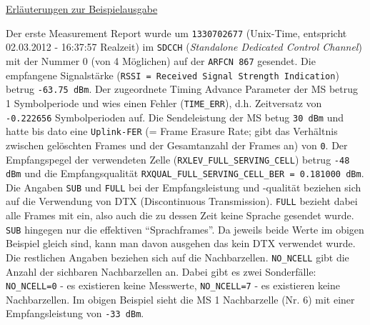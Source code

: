 \underline{Erläuterungen zur Beispielausgabe}

Der erste Measurement Report wurde um \verb|1330702677| (Unix-Time, entspricht 02.03.2012 - 16:37:57 Realzeit) im \verb|SDCCH| (\textit{Standalone Dedicated Control Channel}) mit der Nummer 0 (von 4 Möglichen) auf der \verb|ARFCN 867| gesendet. Die empfangene Signalstärke (\verb|RSSI = Received Signal Strength Indication|) betrug \verb|-63.75 dBm|. Der zugeordnete Timing Advance Parameter der MS betrug 1 Symbolperiode und wies einen Fehler (\verb|TIME_ERR|), d.h. Zeitversatz von \verb|-0.222656| Symbolperioden auf. Die Sendeleistung der MS betug \verb|30 dBm| und hatte bis dato eine \verb|Uplink-FER| (= Frame Erasure Rate; gibt das Verhältnis zwischen gelöschten Frames und der Gesamtanzahl der Frames an) von \verb|0|. Der Empfangspegel der verwendeten Zelle (\verb|RXLEV_FULL_SERVING_CELL|) betrug \verb|-48 dBm| und die Empfangsqualität \verb|RXQUAL_FULL_SERVING_CELL_BER = 0.181000 dBm|. Die Angaben \verb|SUB| und \verb|FULL| bei der Empfangsleistung und -qualität beziehen sich auf die Verwendung von DTX (Discontinuous Transmission). \verb|FULL| bezieht dabei alle Frames mit ein, also auch die zu dessen Zeit keine Sprache gesendet wurde. \verb|SUB| hingegen nur die effektiven "`Sprachframes"'. Da jeweils beide Werte im obigen Beispiel gleich sind, kann man davon ausgehen das kein DTX verwendet wurde. Die restlichen Angaben beziehen sich auf die Nachbarzellen. \verb|NO_NCELL| gibt die Anzahl der sichbaren Nachbarzellen an. Dabei gibt es zwei Sonderfälle: \verb|NO_NCELL=0| - es existieren keine Messwerte, \verb|NO_NCELL=7| - es existieren keine Nachbarzellen. Im obigen Beispiel sieht die MS 1 Nachbarzelle (Nr. 6) mit einer Empfangsleistung von \verb|-33 dBm|. 